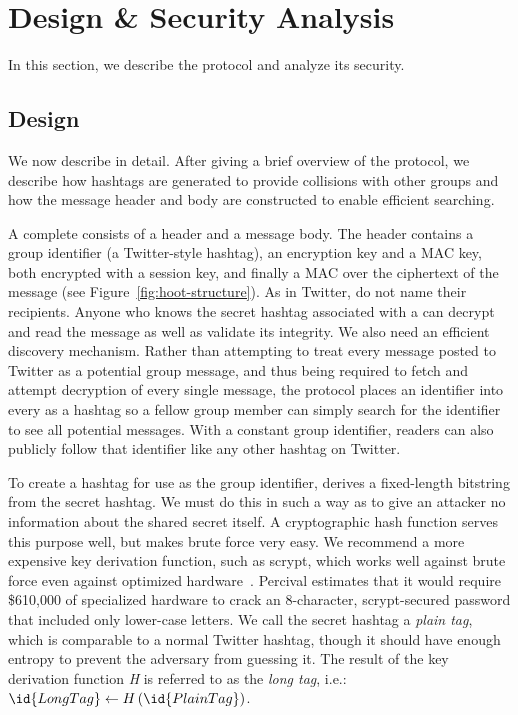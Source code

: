 \section{Design \& Security Analysis}
\label{sec:design-sec}

In this section, we describe the \hoot protocol and analyze its security.

\subsection{Design}
\label{sec:design}

We now describe \hoot in detail. After giving a brief overview of the
\hoot  protocol, we describe how hashtags are generated to provide
collisions with other groups and how the message header and body are
constructed to enable efficient searching.

 A complete \msg consists of a header and
a message body. The header contains a group identifier (a Twitter-style
hashtag), an encryption key and a MAC key, both encrypted with a session
key, and finally a MAC over the ciphertext of the message (see
Figure~\ref{fig:hoot-structure}). As in Twitter, \msgs do not name their
recipients. Anyone who knows the secret hashtag associated with a \msg
can decrypt and read the message as well as validate its integrity. We
also need an efficient discovery mechanism.  Rather than attempting to
treat every message posted to Twitter as a potential group message, and
thus being required to fetch and attempt decryption of every single
message, the \hoot protocol places an identifier into every \msg as a
hashtag so a fellow group member can simply search for the identifier to
see all potential messages. With a constant group identifier, readers
can also publicly follow that identifier like any other hashtag on
Twitter.

 To create a hashtag for use as the group
identifier, \hoot derives a fixed-length bitstring from the secret
hashtag. We must do this in such a way as to give an attacker no
information about the shared secret itself. A cryptographic hash
function serves this purpose well, but makes brute force very easy. We
recommend a more expensive key derivation function, such as scrypt,
which works well against brute force even against optimized
hardware~\cite{scrypt}. Percival estimates that it would require
\$610,000 of specialized hardware to crack an 8-character,
scrypt-secured password that included only lower-case letters.
We call the secret hashtag a \textit{plain tag}, which is comparable to
a normal Twitter hashtag, though it should have enough entropy to
prevent the adversary from guessing it. The result of the key derivation
function \textit{H} is referred to as the \textit{long tag}, i.e.:
%
$\id{LongTag} \leftarrow H\left(\id{PlainTag}\right)$.

